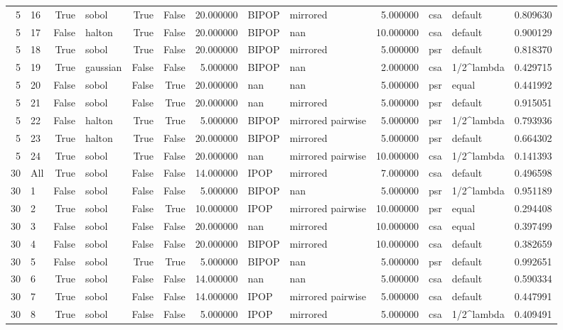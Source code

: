 \begin{tabular}{rlrlrrrllrllr}
5 & 16 & True & sobol & True & False & 20.000000 & BIPOP & mirrored & 5.000000 & csa & default & 0.809630 \\
5 & 17 & False & halton & True & False & 20.000000 & BIPOP & nan & 10.000000 & csa & default & 0.900129 \\
5 & 18 & True & sobol & True & False & 20.000000 & BIPOP & mirrored & 5.000000 & psr & default & 0.818370 \\
5 & 19 & True & gaussian & False & False & 5.000000 & BIPOP & nan & 2.000000 & csa & 1/2^lambda & 0.429715 \\
5 & 20 & False & sobol & False & True & 20.000000 & nan & nan & 5.000000 & psr & equal & 0.441992 \\
5 & 21 & False & sobol & False & True & 20.000000 & nan & mirrored & 5.000000 & psr & default & 0.915051 \\
5 & 22 & False & halton & True & True & 5.000000 & BIPOP & mirrored pairwise & 5.000000 & psr & 1/2^lambda & 0.793936 \\
5 & 23 & True & halton & True & False & 20.000000 & BIPOP & mirrored & 5.000000 & psr & default & 0.664302 \\
5 & 24 & True & sobol & True & False & 20.000000 & nan & mirrored pairwise & 10.000000 & csa & 1/2^lambda & 0.141393 \\
30 & All & True & sobol & False & False & 14.000000 & IPOP & mirrored & 7.000000 & csa & default & 0.496598 \\
30 & 1 & False & sobol & False & False & 5.000000 & BIPOP & nan & 5.000000 & psr & 1/2^lambda & 0.951189 \\
30 & 2 & True & sobol & False & True & 10.000000 & IPOP & mirrored pairwise & 10.000000 & psr & equal & 0.294408 \\
30 & 3 & False & sobol & False & False & 20.000000 & nan & mirrored & 10.000000 & csa & equal & 0.397499 \\
30 & 4 & False & sobol & False & False & 20.000000 & BIPOP & mirrored & 10.000000 & csa & default & 0.382659 \\
30 & 5 & False & sobol & True & True & 5.000000 & BIPOP & nan & 5.000000 & psr & default & 0.992651 \\
30 & 6 & True & sobol & False & False & 14.000000 & nan & nan & 5.000000 & csa & default & 0.590334 \\
30 & 7 & True & sobol & False & False & 14.000000 & IPOP & mirrored pairwise & 5.000000 & csa & default & 0.447991 \\
30 & 8 & True & sobol & False & False & 5.000000 & IPOP & mirrored & 5.000000 & csa & 1/2^lambda & 0.409491 \\

\end{tabular}
